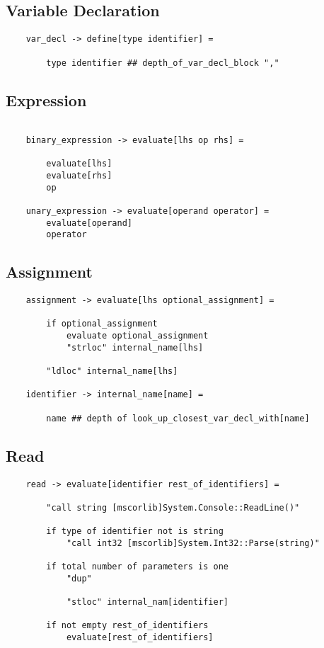 \documentclass{report}
\begin{document}
\subsection{Variable Declaration}
\begin{verbatim}
    var_decl -> define[type identifier] =

        type identifier ## depth_of_var_decl_block ","
\end{verbatim}

\subsection{Expression}

\begin{verbatim}

    binary_expression -> evaluate[lhs op rhs] =

        evaluate[lhs]
        evaluate[rhs]
        op

    unary_expression -> evaluate[operand operator] =
        evaluate[operand]
        operator
\end{verbatim}

\subsection{Assignment}
\begin{verbatim}
    assignment -> evaluate[lhs optional_assignment] =

        if optional_assignment
            evaluate optional_assignment
            "strloc" internal_name[lhs]

        "ldloc" internal_name[lhs]

    identifier -> internal_name[name] =

        name ## depth of look_up_closest_var_decl_with[name]
\end{verbatim}

\subsection{Read}
\begin{verbatim}
    read -> evaluate[identifier rest_of_identifiers] =

        "call string [mscorlib]System.Console::ReadLine()"

        if type of identifier not is string
            "call int32 [mscorlib]System.Int32::Parse(string)"

        if total number of parameters is one
            "dup"

            "stloc" internal_nam[identifier]

        if not empty rest_of_identifiers
            evaluate[rest_of_identifiers]
\end{verbatim}
\end{document}
